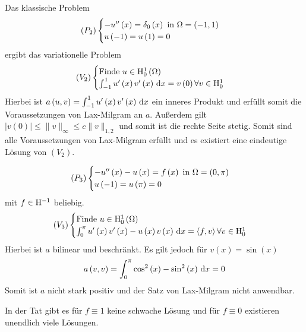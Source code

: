 \begin{expl}
	Das klassische Problem
	\begin{equation*}
		\left(P_{2}\right)\begin{cases}
			-u^{\prime\prime}\left(x\right) = \delta_{0}\left(x\right)\text{ in }\Omega=\left(-1,1\right)\\
			u\left(-1\right) = u\left(1\right) = 0
		\end{cases}
	\end{equation*}
	ergibt das variationelle Problem
	\begin{equation*}
		\left(V_{2}\right)\begin{cases}
			\text{Finde } u\in\mathrm{H}^{1}_{0}\left(\Omega\right)\\
			\int_{-1}^{1} u^{\prime}\left(x\right)v^{\prime}\left(x\right)\,\mathrm{d} x = v\left(0\right) \forall v\in\mathrm{H}^{1}_{0}
		\end{cases}
	\end{equation*}
	Hierbei ist $a\left(u,v\right)=\int_{-1}^{1}u^{\prime}\left(x\right)v^{\prime}\left(x\right)\,\mathrm{d} x$ ein inneres Produkt und erfüllt somit die Voraussetzungen von Lax-Milgram an $a$. Außerdem gilt $|v\left(0\right)|\leq\|v\|_{\infty}\leq c\|v\|_{1,2}$ und somit ist die rechte Seite stetig. Somit sind alle Voraussetzungen von Lax-Milgram erfüllt und es existiert eine eindeutige Lösung von $\left(V_{2}\right)$.
\end{expl}
\begin{expl}
	\begin{equation*}
		\left(P_{3}\right)\begin{cases}
			-u^{\prime\prime}\left(x\right)-u\left(x\right) = f\left(x\right)\text{ in }\Omega=\left(0,\pi\right)\\
			u\left(-1\right) = u\left(\pi\right) = 0
		\end{cases}
	\end{equation*}
	mit $f\in\mathrm{H}^{-1}$ beliebig.
	\begin{equation*}
		\left(V_{3}\right)\begin{cases}
			\text{Finde } u\in\mathrm{H}^{1}_{0}\left(\Omega\right)\\
			\int_{0}^{\pi} u^{\prime}\left(x\right)v^{\prime}\left(x\right)-u\left(x\right)v\left(x\right)\,\mathrm{d} x = \left<f,v\right> \forall v\in\mathrm{H}^{1}_{0}
		\end{cases}
	\end{equation*}
	Hierbei ist $a$ bilinear und beschränkt. Es gilt jedoch für $v\left(x\right)=\operatorname{sin}\left(x\right)${}
	\begin{equation*}
		a\left(v,v\right) = \int_{0}^{\pi} \operatorname{cos}^{2}\left(x\right)-\operatorname{sin}^{2}\left(x\right)\,\mathrm{d} x = 0
	\end{equation*}
	Somit ist $a$ nicht stark positiv und der Satz von Lax-Milgram nicht anwendbar.
	
	In der Tat gibt es für $f\equiv 1$ keine schwache Lösung und für $f\equiv 0$ existieren unendlich viele Lösungen.
\end{expl}
